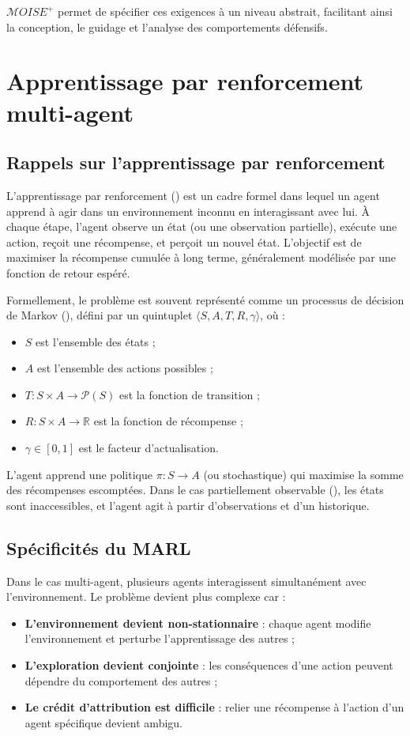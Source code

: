 $\mathcal{M}OISE^+$ permet de spécifier ces exigences à un niveau abstrait, facilitant ainsi la conception, le guidage et l'analyse des comportements défensifs.

\section{Apprentissage par renforcement multi-agent}

\subsection{Rappels sur l'apprentissage par renforcement}

L'apprentissage par renforcement () est un cadre formel dans lequel un agent apprend à agir dans un environnement inconnu en interagissant avec lui. À chaque étape, l'agent observe un état (ou une observation partielle), exécute une action, reçoit une récompense, et perçoit un nouvel état. L'objectif est de maximiser la récompense cumulée à long terme, généralement modélisée par une fonction de retour espéré.

Formellement, le problème est souvent représenté comme un processus de décision de Markov (), défini par un quintuplet $\langle S, A, T, R, \gamma \rangle$, où :
\begin{itemize}
    \item $S$ est l'ensemble des états ;
    \item $A$ est l'ensemble des actions possibles ;
    \item $T: S \times A \rightarrow \mathcal{P}(S)$ est la fonction de transition ;
    \item $R: S \times A \rightarrow \mathbb{R}$ est la fonction de récompense ;
    \item $\gamma \in [0,1]$ est le facteur d'actualisation.
\end{itemize}

L'agent apprend une politique $\pi : S \rightarrow A$ (ou stochastique) qui maximise la somme des récompenses escomptées. Dans le cas partiellement observable (), les états sont inaccessibles, et l'agent agit à partir d'observations et d'un historique.

\subsection{Spécificités du MARL}

Dans le cas multi-agent, plusieurs agents interagissent simultanément avec l'environnement. Le problème devient plus complexe car :
\begin{itemize}
    \item \textbf{L'environnement devient non-stationnaire} : chaque agent modifie l'environnement et perturbe l'apprentissage des autres ;
    \item \textbf{L'exploration devient conjointe} : les conséquences d'une action peuvent dépendre du comportement des autres ;
    \item \textbf{Le crédit d'attribution est difficile} : relier une récompense à l'action d'un agent spécifique devient ambigu.
\end{itemize}

